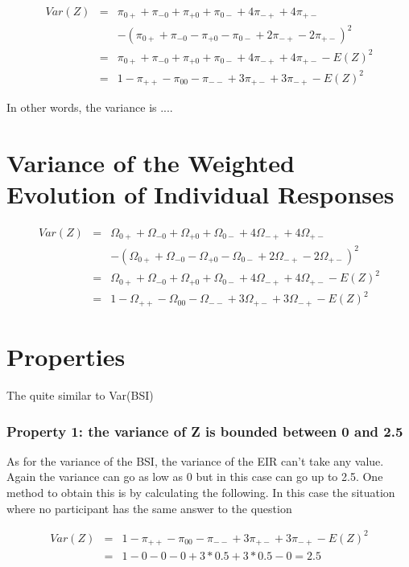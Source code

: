 \documentclass[12pt,a4paper,oneside]{book}
\begin{document}
\begin{eqnarray}
Var(Z) &=& \pi_{0+} + \pi_{-0} + \pi_{+0} + \pi_{0-} +4\pi_{-+} +4\pi_{+-} \nonumber \\ 
&&    - (\pi_{0+} + \pi_{-0} - \pi_{+0} - \pi_{0-} +2\pi_{-+} -2\pi_{+-})^2  \\
&=& \pi_{0+} + \pi_{-0} + \pi_{+0} + \pi_{0-} +4\pi_{-+} +4\pi_{+-} - E(Z)^2  \\
&=& 1 - \pi_{++} - \pi_{00} - \pi_{--} + 3\pi_{+-} + 3\pi_{-+} - E(Z)^2
\end{eqnarray}

In other words, the variance is ....



\section{Variance of the Weighted Evolution of Individual Responses}


\begin{eqnarray}
Var(Z) &=& \Omega_{0+} + \Omega_{-0} + \Omega_{+0} + \Omega_{0-} +4\Omega_{-+} +4\Omega_{+-} \nonumber \nonumber \\ 
&&    - (\Omega_{0+} + \Omega_{-0} - \Omega_{+0} - \Omega_{0-} +2\Omega_{-+} -2\Omega_{+-})^2  \\
&=& \Omega_{0+} + \Omega_{-0} + \Omega_{+0} + \Omega_{0-} +4\Omega_{-+} +4\Omega_{+-} - E(Z)^2  \\
&=& 1 - \Omega_{++} - \Omega_{00} - \Omega_{--} + 3\Omega_{+-} + 3\Omega_{-+} - E(Z)^2
\end{eqnarray}


\section{Properties}

The 
quite similar to Var(BSI)


\subsubsection{Property 1: the variance of Z is bounded between 0 and 2.5}
As for the variance of the BSI, the variance of the EIR can't take any value.
Again the variance can go as low as 0 but in this case can go up to 2.5. One method to obtain this is by calculating the following. In this case the situation where no participant has the same answer to the question 

\begin{eqnarray}
Var(Z) &=& 1 - \pi_{++} - \pi_{00} - \pi_{--} + 3\pi_{+-} + 3\pi_{-+} - E(Z)^2 \nonumber \\
    &=& 1 - 0 - 0 - 0 + 3*0.5 + 3*0.5 - 0 = 2.5 \nonumber
\end{eqnarray}
\end{document}
